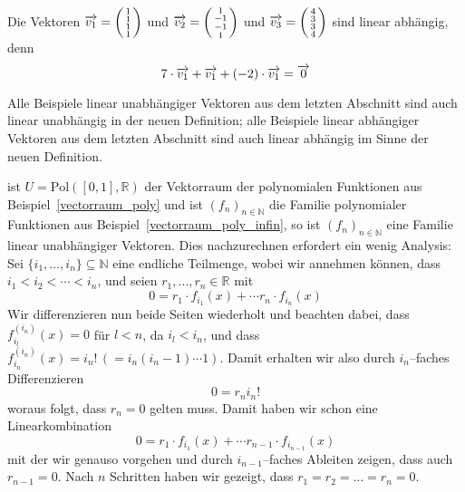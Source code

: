 \begin{beispiel} Die Vektoren $\overrightarrow{v_1} = \left( \begin{smallmatrix} 1 \\ 1 \\ 1 \\ 1 
\end{smallmatrix} \right)$ und $\overrightarrow{v_2} = \left( \begin{smallmatrix} 1 \\ -1 \\ -1 \\ 1 
\end{smallmatrix} \right)$ und $\overrightarrow{v_3} = \left( \begin{smallmatrix} 4 \\ 3 \\ 3 \\ 4 
\end{smallmatrix} \right)$ sind linear abhängig, denn 
  	$$ 7 \cdot \overrightarrow{v_1} + \overrightarrow{v_1} + (-2) \cdot \overrightarrow{v_1} = \overrightarrow{0} $$
\end{beispiel}

\begin{beispiel} Alle Beispiele linear unabhängiger Vektoren aus dem letzten Abschnitt sind auch linear 
unabhängig in der neuen Definition; alle Beispiele linear abhängiger Vektoren aus dem letzten Abschnitt sind 
auch linear abhängig im Sinne der neuen Definition.
\end{beispiel}

\begin{beispiel}\label{vectorraum_poly_lin_un} ist $U = \textrm{Pol}([0,1], \mathbb R)$ der Vektorraum der 
polynomialen Funktionen aus Beispiel~\ref{vectorraum_poly} und ist $\left( f_{n} \right)_{n \in \mathbb N}$
die Familie polynomialer Funktionen aus Beispiel~\ref{vectorraum_poly_infin}, so ist 
$\left( f_{n} \right)_{n \in \mathbb N}$ eine Familie linear unabhängiger Vektoren. Dies nachzurechnen 
erfordert ein wenig Analysis: 
Sei $\{ i_1, \ldots , i_n \} \subseteq \mathbb N$ eine endliche Teilmenge, wobei wir annehmen können, dass $i_1 
< i_2 < \cdots < i_n$, und seien $r_1, \ldots , r_n \in \mathbb R$ mit 
  	$$ 0 = r_1 \cdot f_{i_1}(x) + \cdots r_n \cdot f_{i_n}(x) $$
Wir differenzieren nun beide Seiten wiederholt und beachten dabei, dass $f_{i_l}^{(i_n)}(x) = 0$ für $l < n$, 
da $i_l < i_n$, und dass $f_{i_n}^{(i_n)}(x) = i_n! \, (= i_n(i_n-1) \cdots 1)$. Damit erhalten wir also durch 
$i_n$--faches Differenzieren
  	$$ 0 = r_n i_n! $$
woraus folgt, dass $r_n = 0$ gelten muss. Damit haben wir schon eine Linearkombination
  	$$ 0 = r_1 \cdot f_{i_1}(x) + \cdots r_{n-1} \cdot f_{i_{n-1}}(x) $$ 
mit der wir genauso vorgehen und durch $i_{n-1}$--faches Ableiten zeigen, dass auch $r_{n-1} = 0$. Nach $n$ 
Schritten haben wir gezeigt, dass $r_1 = r_2 = \ldots = r_n = 0$.
\end{beispiel}

